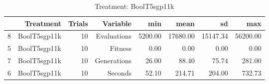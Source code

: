\begin{table}[ht]
\centering
\begin{tabular}{rrrrrrrr}
  \hline
 & Treatment & Trials & Variable & min & mean & sd & max \\ 
  \hline
8 & BoolT5sgp11k &  10 & Evaluations & 5200.00 & 17680.00 & 15147.34 & 56200.00 \\ 
  5 & BoolT5sgp11k &  10 & Fitness & 0.00 & 0.00 & 0.00 & 0.00 \\ 
  7 & BoolT5sgp11k &  10 & Generations & 26.00 & 88.40 & 75.74 & 281.00 \\ 
  6 & BoolT5sgp11k &  10 & Seconds & 52.10 & 214.71 & 204.00 & 732.73 \\ 
   \hline
\end{tabular}
\caption{Treatment: BoolT5sgp11k} 
\end{table}
